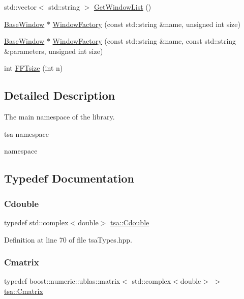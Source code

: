 \begin{DoxyCompactItemize}
\item 
std\+::vector$<$ std\+::string $>$ \hyperlink{namespacetsa_a98f39538beaf84d9f18635e0062f6b3e}{Get\+Window\+List} ()
\item 
\hyperlink{classtsa_1_1_base_window}{Base\+Window} $\ast$ \hyperlink{namespacetsa_ad40921629f819f9f2907db1fc8c1b63a}{Window\+Factory} (const std\+::string \&name, unsigned int size)
\item 
\hyperlink{classtsa_1_1_base_window}{Base\+Window} $\ast$ \hyperlink{namespacetsa_a1fe617a1ebaccc86dac0d06ccb16372e}{Window\+Factory} (const std\+::string \&name, const std\+::string \&parameters, unsigned int size)
\item 
int \hyperlink{namespacetsa_ab56a65a614e542cef8536f461fc185a5}{F\+F\+Tsize} (int n)
\end{DoxyCompactItemize}


\subsection{Detailed Description}
The main namespace of the library. 

tsa namespace

namespace 

\subsection{Typedef Documentation}
\mbox{\label{namespacetsa_a7b1f40fa90474b78dd0ab472b7c37547}} 
\subsubsection{\texorpdfstring{Cdouble}{Cdouble}}
{\footnotesize\ttfamily typedef std\+::complex$<$double$>$ \hyperlink{namespacetsa_a7b1f40fa90474b78dd0ab472b7c37547}{tsa\+::\+Cdouble}}



Definition at line 70 of file tsa\+Types.\+hpp.

\mbox{\label{namespacetsa_a86348fef1603a135fe5fba9e5f5486ee}} 
\subsubsection{\texorpdfstring{Cmatrix}{Cmatrix}}
{\footnotesize\ttfamily typedef boost\+::numeric\+::ublas\+::matrix$<$ std\+::complex$<$double$>$ $>$ \hyperlink{namespacetsa_a86348fef1603a135fe5fba9e5f5486ee}{tsa\+::\+Cmatrix}}



